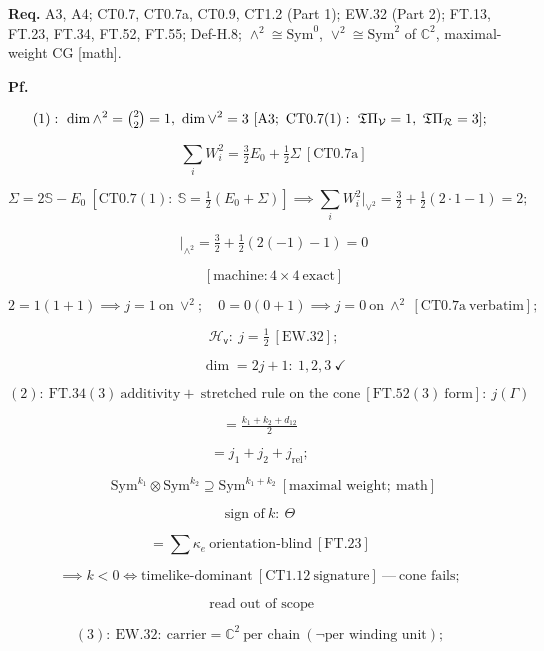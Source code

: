 \begin{theorem}
\textbf{Req.} A3, A4; CT0.7, CT0.7a, CT0.9, CT1.2 (Part 1); EW.32 (Part 2); FT.13, FT.23, FT.34, FT.52, FT.55; Def-H.8; $\wedge^2\cong\mathrm{Sym}^0$, $\vee^2\cong\mathrm{Sym}^2$ of $\mathbb C^2$, maximal-weight CG [math].

\textbf{Pf.}

\[
(1):\ \dim\wedge^2=\tbinom{2}{2}=1,\ \dim\vee^2=3\ [\mathrm{A3};\ \mathrm{CT0.7}(1):\ \mathfrak T\Pi_{\mathcal V}=1,\ \mathfrak T\Pi_{\mathcal R}=3];
\]

\[
\qquad \textstyle\sum_iW_i^2=\tfrac32E_0+\tfrac12\Sigma\ [\mathrm{CT0.7a}]
\]

\[
\Sigma=2\mathbb S-E_0\ [\mathrm{CT0.7}(1):\ \mathbb S=\tfrac12(E_0+\Sigma)]\implies\textstyle\sum_iW_i^2\big|_{\vee^2}=\tfrac32+\tfrac12(2\cdot1-1)=2;
\]

\[
\qquad \big|_{\wedge^2}=\tfrac32+\tfrac12(2(-1)-1)=0
\]

\[
\qquad [\text{machine}:4\times4\ \text{exact}]
\]

\[
2=1(1{+}1)\implies j=1\ \text{on}\ \vee^2;\quad0=0(0{+}1)\implies j=0\ \text{on}\ \wedge^2\ [\mathrm{CT0.7a}\ \text{verbatim}];
\]

\[
\qquad \mathcal H_{\mathsf v}:\ j=\tfrac12\ [\mathrm{EW.32}];
\]

\[
\qquad \dim=2j{+}1:\ 1,2,3\ \checkmark
\]

\[
(2):\ \mathrm{FT.34}(3)\ \text{additivity}+\ \text{stretched rule on the cone}\ [\mathrm{FT.52}(3)\ \text{form}]:\ j(\Gamma)
\]

\[
= \tfrac{k_1+k_2+d_{12}}{2}
\]

\[
= j_1+j_2+j_{\mathrm{rel}};
\]

\[
\qquad \mathrm{Sym}^{k_1}\otimes\mathrm{Sym}^{k_2}\supseteq\mathrm{Sym}^{k_1+k_2}\ [\text{maximal weight};\ \text{math}]
\]

\[
\text{sign of}\ k:\ \Theta
\]

\[
= \sum\kappa_e\ \text{orientation-blind}\ [\mathrm{FT.23}]
\]

\[
\implies k<0\iff\text{timelike-dominant}\ [\mathrm{CT1.12}\ \text{signature}]\ —\ \text{cone fails};
\]

\[
\ \text{read out of scope}
\]

\[
(3):\ \mathrm{EW.32}:\ \text{carrier}=\mathbb C^2\ \text{per chain}\ (\neg\text{per winding unit});
\]


\end{theorem}
